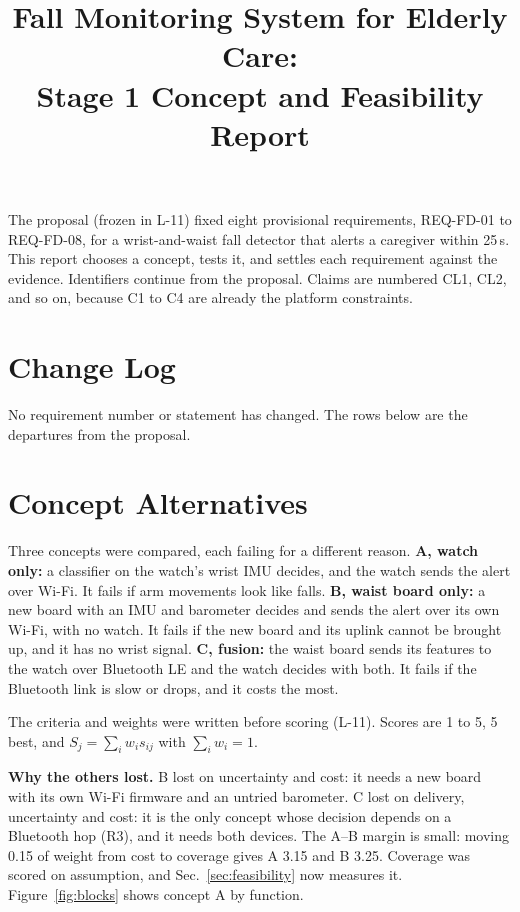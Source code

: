 \documentclass[conference]{IEEEtran}
\title{Fall Monitoring System for Elderly Care:\\ Stage 1 Concept and Feasibility Report}
\author{
    \IEEEauthorblockN{Gianluca D'Altorio}
    \IEEEauthorblockA{Department of Computer Engineering Technology\\
    Vanier College}
}
\newcommand{\Lfreeze}{L-11}        %
\begin{document}
\maketitle

The proposal (frozen in \Lfreeze) fixed eight provisional requirements, REQ-FD-01 to REQ-FD-08, for a wrist-and-waist fall detector that alerts a caregiver within 25\,s. This report chooses a concept, tests it, and settles each requirement against the evidence. Identifiers continue from the proposal. Claims are numbered CL1, CL2, and so on, because C1 to C4 are already the platform constraints.

\section{Change Log}
\label{sec:changes}

No requirement number or statement has changed. The rows below are the departures from the proposal.



\section{Concept Alternatives}
\label{sec:concepts}

Three concepts were compared, each failing for a different reason. \textbf{A, watch only:} a classifier on the watch's wrist IMU decides, and the watch sends the alert over Wi-Fi. It fails if arm movements look like falls. \textbf{B, waist board only:} a new board with an IMU and barometer decides and sends the alert over its own Wi-Fi, with no watch. It fails if the new board and its uplink cannot be brought up, and it has no wrist signal. \textbf{C, fusion:} the waist board sends its features to the watch over Bluetooth LE and the watch decides with both. It fails if the Bluetooth link is slow or drops, and it costs the most.

The criteria and weights were written before scoring (\Lfreeze). Scores are 1 to 5, 5 best, and $S_j=\sum_i w_i s_{ij}$ with $\sum_i w_i=1$.



\textbf{Why the others lost.} B lost on uncertainty and cost: it needs a new board with its own Wi-Fi firmware and an untried barometer. C lost on delivery, uncertainty and cost: it is the only concept whose decision depends on a Bluetooth hop (R3), and it needs both devices. The A--B margin is small: moving 0.15 of weight from cost to coverage gives A 3.15 and B 3.25. Coverage was scored on assumption, and Sec.~\ref{sec:feasibility} now measures it. Figure~\ref{fig:blocks} shows concept A by function.
\end{document}
